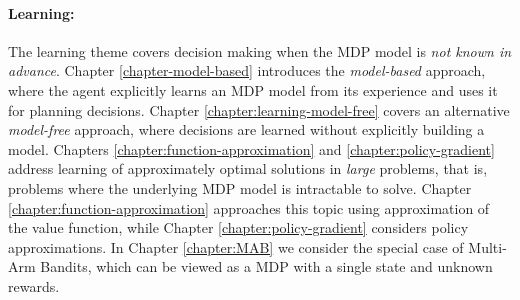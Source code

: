 \paragraph{Learning:} The learning theme covers decision making when the MDP model is \textit{not known in advance}. Chapter \ref{chapter-model-based} introduces the \textit{model-based} approach, where the agent explicitly learns an MDP model from its experience and uses it for planning decisions. Chapter \ref{chapter:learning-model-free} covers an alternative \textit{model-free} approach, where decisions are learned without explicitly building a model. Chapters \ref{chapter:function-approximation} and \ref{chapter:policy-gradient} address learning of approximately optimal solutions in \textit{large} problems, that is, problems where the underlying MDP model is intractable to solve. Chapter \ref{chapter:function-approximation} approaches this topic using approximation of the value function, while Chapter \ref{chapter:policy-gradient} considers policy approximations. In Chapter \ref{chapter:MAB} we consider the special case of Multi-Arm Bandits, which can be viewed as a MDP with a single state and unknown rewards. 


